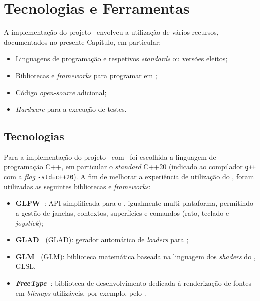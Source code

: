 \chapter{Tecnologias e Ferramentas}
\label{ch::tecno}


A implementação do projeto \theapp~envolveu a utilização de vários recursos, documentados no presente Capítulo, em particular:

\begin{itemize}[nosep]
	\item Linguagens de programação e respetivos \textit{standards} ou versões eleitos;
	\item Bibliotecas e \textit{frameworks} para programar em \opengl;
	\item Código \textit{open-source} adicional;
	\item \textit{Hardware} para a execução de testes.
\end{itemize}


\section{Tecnologias}
\label{sec::tecno:tecno}

Para a implementação do projeto \theapp~com \opengl~foi escolhida a linguagem de programação C++, em particular o \textit{standard} C++20 (indicado ao compilador \verb|g++| com a \textit{flag} \verb|-std=c++20|). A fim de melhorar a experiência de utilização do \opengl, foram utilizadas as seguintes bibliotecas e \textit{frameworks}:

\begin{itemize}
    \item \textbf{GLFW~\cite{glfw}}: \ac{API} simplificada para o \opengl, igualmente multi-plataforma, permitindo a gestão de janelas, contextos, superfícies e comandos (rato, teclado e \textit{joystick});
    
    \item \textbf{\acs{GLAD}~\cite{glad,glad-webservice}} (\acl{GLAD}): gerador automático de \textit{loaders} para \opengl;
    
    \item \textbf{\acs{GLM}~\cite{glm}} (\acl{GLM}): biblioteca matemática baseada na linguagem dos \textit{shaders} do \opengl, \ac{GLSL}.
    
    \item \textbf{\textit{FreeType}~\cite{freetype}}: biblioteca de desenvolvimento dedicada à renderização de fontes em \textit{bitmaps} utilizáveis, por exemplo, pelo \opengl.
\end{itemize}

